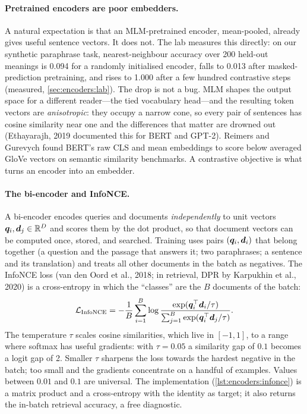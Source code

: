 \paragraph{Pretrained encoders are poor embedders.} A natural expectation is that an MLM-pretrained
encoder, mean-pooled, already gives useful sentence vectors. It does not. The lab measures this
directly: on our synthetic paraphrase task, nearest-neighbour accuracy over 200 held-out meanings is
0.094 for a randomly initialised encoder, falls to 0.013 after masked-prediction pretraining, and
rises to 1.000 after a few hundred contrastive steps (measured, \cref{sec:encoders:lab}). The drop is
not a bug. MLM shapes the output space for a different reader---the tied vocabulary head---and the
resulting token vectors are \emph{anisotropic}: they occupy a narrow cone, so every pair of sentences
has cosine similarity near one and the differences that matter are drowned out (Ethayarajh, 2019
documented this for BERT and GPT-2). Reimers and Gurevych found BERT's raw CLS and mean embeddings to
score below averaged GloVe vectors on semantic similarity benchmarks. A contrastive objective is what
turns an encoder into an embedder.

\paragraph{The bi-encoder and InfoNCE.} A bi-encoder encodes queries and documents \emph{independently}
to unit vectors $\bm{q}_i,\bm{d}_j\in\mathbb R^D$ and scores them by the dot product, so that document
vectors can be computed once, stored, and searched. Training uses pairs $(\bm{q}_i,\bm{d}_i)$ that
belong together (a question and the passage that answers it; two paraphrases; a sentence and its
translation) and treats all other documents in the batch as negatives. The InfoNCE loss
(van den Oord et al., 2018; in retrieval, DPR by Karpukhin et al., 2020) is a cross-entropy in which
the ``classes'' are the $B$ documents of the batch:
\begin{equation}
\mathcal L_\text{InfoNCE} = -\frac1B\sum_{i=1}^{B}\log
\frac{\exp(\bm{q}_i^\top\bm{d}_i/\tau)}{\sum_{j=1}^{B}\exp(\bm{q}_i^\top\bm{d}_j/\tau)} .
\label{eq:encoders:infonce}
\end{equation}
The temperature $\tau$ scales cosine similarities, which live in $[-1,1]$, to a range where softmax
has useful gradients: with $\tau=0.05$ a similarity gap of $0.1$ becomes a logit gap of 2. Smaller
$\tau$ sharpens the loss towards the hardest negative in the batch; too small and the gradients
concentrate on a handful of examples. Values between $0.01$ and $0.1$ are universal. The
implementation (\cref{lst:encoders:infonce}) is a matrix product and a cross-entropy with the
identity as target; it also returns the in-batch retrieval accuracy, a free diagnostic.

